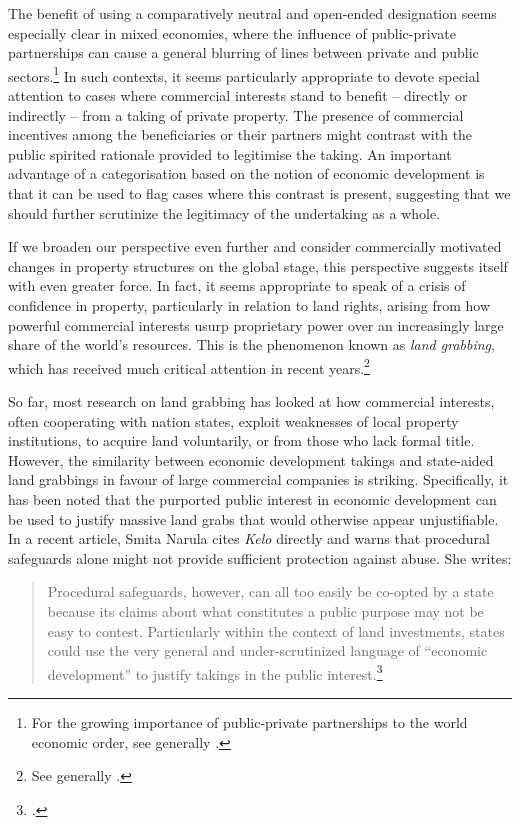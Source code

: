 The benefit of using a comparatively neutral and open-ended designation seems especially clear in mixed economies, where the influence of public-private partnerships can cause a general blurring of lines between private and public sectors.\footnote{For the growing importance of public-private partnerships to the world economic order, see generally \cite{saussier13}.} In such contexts, it seems particularly appropriate to devote special attention to cases where commercial interests stand to benefit -- directly or indirectly -- from a taking of private property. The presence of commercial incentives among the beneficiaries or their partners might contrast with the public spirited rationale provided to legitimise the taking. An important advantage of a categorisation based on the notion of economic development is that it can be used to flag cases where this contrast is present, suggesting that we should further scrutinize the legitimacy of the undertaking as a whole.

If we broaden our perspective even further and consider commercially motivated changes in property structures on the global stage, this perspective suggests itself with even greater force. In fact, it seems appropriate to speak of a crisis of confidence in property, particularly in relation to land rights, arising from how powerful commercial interests usurp proprietary power over an increasingly large share of the world's resources. This is the phenomenon known as {\it land grabbing}, which has received much critical attention in recent years.\footnote{See generally \cite{borras11}.}

So far, most research on land grabbing has looked at how commercial interests, often cooperating with nation states, exploit weaknesses of local property institutions, to acquire land voluntarily, or from those who lack formal title. However, the similarity between economic development takings and state-aided land grabbings in favour of large commercial companies is striking. Specifically, it has been noted that the purported public interest in economic development can be used to justify massive land grabs that would otherwise appear unjustifiable. In a recent article, Smita Narula cites {\it Kelo} directly and warns that procedural safeguards alone might not provide sufficient protection against abuse. She writes:

\begin{quote}
Procedural safeguards, however, can all too easily be co-opted by a state because its claims about what constitutes a public purpose may not be easy to contest. Particularly within the context of land investments, states could use the very general and under-scrutinized language of ``economic development'' to justify takings in the public interest.\footcite[157]{narula13}
\end{quote}

